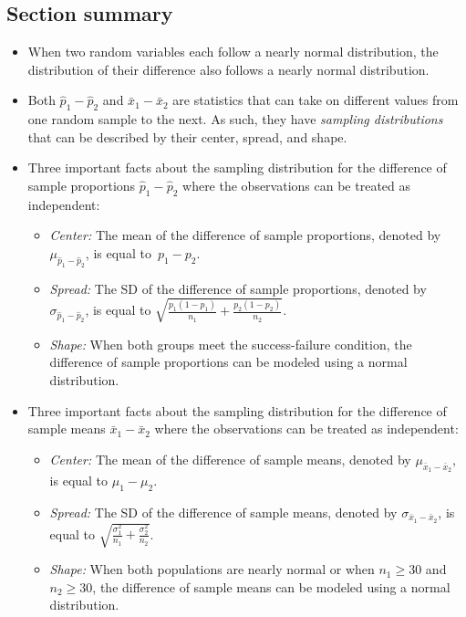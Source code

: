 \subsection*{Section summary}

\begin{itemize}
\item When two random variables each follow a nearly normal distribution, the distribution of their difference also follows a nearly normal distribution.

\item
  Both $\hat{p}_1-\hat{p}_2$ and $\bar{x}_1-\bar{x}_2$ are
  statistics that can take on different values from one random
  sample to the next.
  As such, they have \emph{sampling distributions} that can be
  described by their center, spread, and shape.

\item Three important facts about the sampling distribution for the difference of sample proportions $\hat{p}_1-\hat{p}_2$ where the observations can be treated as independent:
\begin{itemize}\vspace{-1mm}
  \setlength{\itemsep}{0mm}
  \item \textit{Center:} The mean of the difference of sample proportions, denoted by $\mu_{\hat{p}_1-\hat{p}_2}$, is equal to~$p_1-p_2$.
  \item \textit{Spread:} The SD of the difference of sample proportions, denoted by $\sigma_{\hat{p}_1-\hat{p}_2}$, is equal to $\sqrt{\frac{p_1(1-p_1)}{n_1} + \frac{p_2(1-p_2)}{n_2}}$.
  \item \textit{Shape:} When both groups meet the success-failure condition, the difference of sample proportions can be modeled using a normal distribution.
\end{itemize}


\item Three important facts about the sampling distribution for the difference of sample means $\bar{x}_1-\bar{x}_2$ where the observations can be treated as independent:
\begin{itemize}\vspace{-1mm}
  \setlength{\itemsep}{0mm}
  \item \textit{Center:} The mean of the difference of sample means, denoted by $\mu_{\bar{x}_1-\bar{x}_2}$, is equal to $\mu_1-\mu_2$.
  \item \textit{Spread:} The SD of the difference of sample means, denoted by $\sigma_{\bar{x}_1-\bar{x}_2}$, is equal to $ \sqrt{\frac{\sigma_1^2}{n_1} + \frac{\sigma_2^2}{n_2}}$.
  \item \textit{Shape:} When both populations are nearly normal or when $n_1\ge 30$ and $n_2\ge 30$, the difference of sample means can be modeled using a normal distribution.
\end{itemize}


\end{itemize}
